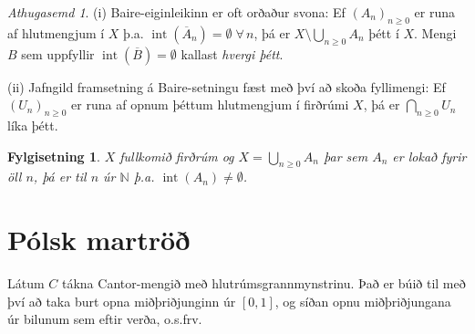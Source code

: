 \documentclass[a4paper,icelandic]{book}
\theoremstyle{definition}
\theoremstyle{plain}
\newtheorem{fylgisetn}{Fylgisetning}[section]
\theoremstyle{remark}
\newtheorem*{ath}{Athugasemd}
\newcommand{\N}{\mathbb{N}} %
\DeclareMathOperator{\innmengi}{int} %
\begin{document}
\begin{ath}
  (i) Baire-eiginleikinn er oft orðaður svona: Ef $(A_n)_{n\geq 0}$ er runa af
  hlutmengjum í $X$ þ.a. $\innmengi(\overline A_n)=\emptyset\;\forall\,n$, þá er
  $X\setminus\bigcup_{n\geq 0}A_n$ þétt í $X$. Mengi $B$ sem uppfyllir
  $\innmengi(\overline B)=\emptyset$ kallast \emph{hvergi þétt}.

  (ii) Jafngild framsetning á Baire-setningu fæst með því að skoða fyllimengi:
  Ef $(U_n)_{n\geq 0}$ er runa af opnum þéttum hlutmengjum í firðrúmi $X$, þá er
  $\bigcap_{n\geq 0} U_n$ líka þétt.
\end{ath}
\begin{fylgisetn}
  $X$ fullkomið firðrúm og $X =\bigcup_{n\geq 0} A_n$ þar sem $A_n$ er lokað
  fyrir öll $n$, þá er til $n$ úr $\N$ þ.a. $\innmengi(A_n) \neq \emptyset$.
\end{fylgisetn}

\section{Pólsk martröð}
\label{sec:polsk_martrod}
Látum $C$ tákna Cantor-mengið með hlutrúmsgrannmynstrinu. Það er búið til með
því að taka burt opna miðþriðjunginn úr $\left[0,1\right]$, og síðan opnu
miðþriðjungana úr bilunum sem eftir verða, o.s.frv.
\end{document}
